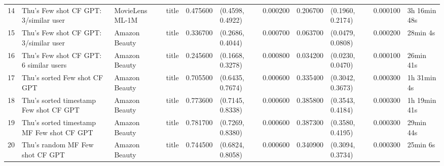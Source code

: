 \begin{tabular}{llllrllrlll}
14 & Thu's Few shot CF GPT: 3/similar user & MovieLens ML-1M & title & 0.475600 & (0.4598, 0.4922) & 0.000200 & 0.206700 & (0.1960, 0.2174) & 0.000100 & 3h 16min 48s \\
15 & Thu's Few shot CF GPT: 3/similar user & Amazon Beauty & title & 0.336700 & (0.2686, 0.4044) & 0.000700 & 0.063700 & (0.0479, 0.0808) & 0.000200 & 28min 4s \\
16 & Thu's Few shot CF GPT: 6 similar users & Amazon Beauty & title & 0.245600 & (0.1668, 0.3278) & 0.000800 & 0.034200 & (0.0230, 0.0470) & 0.000100 & 26min 41s \\
17 & Thu's sorted Few shot CF GPT & Amazon Beauty & title & 0.705500 & (0.6435, 0.7674) & 0.000600 & 0.335400 & (0.3042, 0.3673) & 0.000300 & 1h 31min 4s \\
18 & Thu's sorted timestamp Few shot CF GPT & Amazon Beauty & title & 0.773600 & (0.7145, 0.8338) & 0.000600 & 0.385800 & (0.3543, 0.4184) & 0.000300 & 1h 19min 41s \\
19 & Thu's sorted timestamp MF Few shot CF GPT & Amazon Beauty & title & 0.781700 & (0.7269, 0.8380) & 0.000600 & 0.387300 & (0.3580, 0.4195) & 0.000300 & 29min 44s \\
20 & Thu's random MF Few shot CF GPT & Amazon Beauty & title & 0.744500 & (0.6824, 0.8058) & 0.000600 & 0.340900 & (0.3094, 0.3734) & 0.000300 & 25min 6s \\
\end{tabular}
